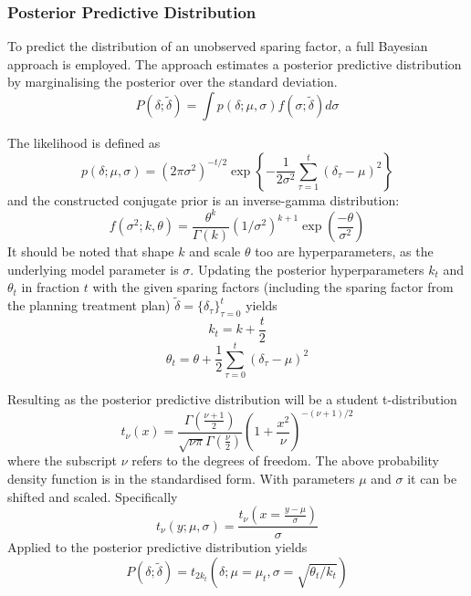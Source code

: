 \documentclass[\relativeRoot/ada.tex]{subfiles}
\begin{document}
\subsubsection{Posterior Predictive Distribution}
To predict the distribution of an unobserved sparing factor, a full Bayesian approach is employed. The approach estimates a posterior predictive distribution by marginalising the posterior over the standard deviation.
\begin{equation*}
    P(\delta; \tilde{\delta}) = \int p(\delta;\mu, \sigma) f(\sigma; \tilde{\delta}) d \sigma
\end{equation*}

The likelihood is defined as
\begin{equation*}
    p\left(\delta; \mu, \sigma \right)=\left(2 \pi \sigma^{2}\right)^{-t / 2} \exp \left\{-\frac{1}{2 \sigma^{2}} \sum_{\tau=1}^{t}\left(\delta_{\tau}-\mu\right)^{2}\right\}
\end{equation*}
and the constructed conjugate prior is an inverse-gamma distribution:
\begin{equation}\label{eq:inv_gamma}
    f(\sigma^2;k,\theta) = \frac{\theta^k}{\Gamma(k)} (1/\sigma^2)^{k+1}\exp\left(\frac{-\theta}{\sigma^2}\right)
\end{equation}
It should be noted that shape $k$ and scale $\theta$ too are hyperparameters, as the underlying model parameter is $\sigma$. Updating the posterior hyperparameters $k_t$ and $\theta_t$ in fraction $t$ with the given sparing factors (including the sparing factor from the planning treatment plan) $\tilde{\delta} = \{\delta_\tau\}_{\tau=0}^{t}$ yields
\begin{equation}\label{eq:k_hyper}
    k_t = k +\frac{t}{2}
\end{equation}
\begin{equation}\label{eq:theta_hyper}
    \theta_t = \theta + \frac{1}{2} \sum_{\tau = 0}^t (\delta_{\tau} - \mu)^2
\end{equation}

Resulting as the posterior predictive distribution will be a student t-distribution
\begin{equation*}
    t_{\nu}(x)=\frac{\Gamma\left(\frac{\nu+1}{2}\right)}{\sqrt{\nu \pi} \Gamma\left(\frac{\nu}{2}\right)}\left(1+\frac{x^{2}}{\nu}\right)^{-(\nu+1) / 2}
\end{equation*}
where the subscript $\nu$ refers to the degrees of freedom. The above probability density function is in the standardised form. With parameters $\mu$ and $\sigma$ it can be shifted and scaled. Specifically
\begin{equation*}
    t_{\nu}(y; \mu, \sigma)=\frac{t_{\nu}\left(x=\frac{y - \mu}{\sigma}\right)}{\sigma}
\end{equation*}
Applied to the posterior predictive distribution yields
\begin{equation}\label{eq:postior_pred}
    P(\delta; \tilde{\delta}) = t_{2 k_t} (\delta; \mu = \mu_t, \sigma = \sqrt{\theta _t/ k_t})
\end{equation}
\end{document}

